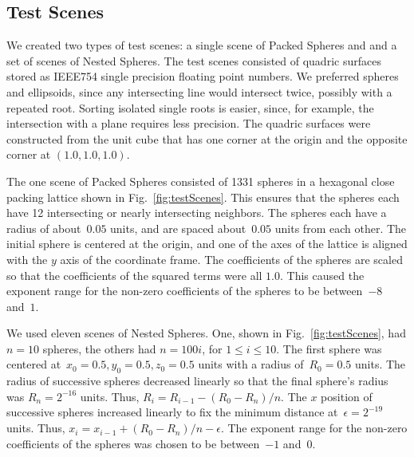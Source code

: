 \documentclass{cccg16}
\begin{document}
\subsection{Test Scenes}
We created two types of test scenes: a single scene of Packed Spheres
and and a set of scenes of Nested Spheres.  The test scenes consisted
of quadric surfaces stored as IEEE754 single precision floating point
numbers.  We preferred spheres and ellipsoids, since any intersecting
line would intersect twice, possibly with a repeated root.  Sorting
isolated single roots is easier, since, for example, the intersection
with a plane requires less precision. The quadric surfaces were
constructed from the unit cube that has one corner at the origin and
the opposite corner at $(1.0, 1.0, 1.0)$.

The one scene of Packed Spheres consisted of 1331 spheres in a
hexagonal close packing lattice shown in Fig.~\ref{fig:testScenes}.
This ensures that the spheres each have 12 intersecting or nearly
intersecting neighbors.  The spheres each have a radius of
about~$0.05$ units, and are spaced about~$0.05$ units from each other.
The initial sphere is centered at the origin, and one of the axes of
the lattice is aligned with the $y$ axis of the coordinate frame.  The
coefficients of the spheres are scaled so that the coefficients of the
squared terms were all $1.0$. This caused the exponent range for the
non-zero coefficients of the spheres to be between~$-8$ and~$1$.

We used eleven scenes of Nested Spheres. One, shown in
Fig.~\ref{fig:testScenes}, had $n=10$ spheres, the others had
$n=100i$, for $1\leq i \leq 10$.  The first sphere was centered
at~$x_0=0.5, y_0=0.5, z_0=0.5$ units with a radius of~$R_0=0.5$ units.
The radius of successive spheres decreased linearly so that the final
sphere's radius was $R_n=2^{-16}$ units.  Thus,
$R_i=R_{i-1}-(R_0-R_n)/n$.  The $x$ position of successive spheres
increased linearly to fix the minimum distance at~$\epsilon=2^{-19}$
units. Thus, $x_i=x_{i-1}+(R_0-R_n)/n-\epsilon$.  The exponent range
for the non-zero coefficients of the spheres was chosen to be
between~$-1$ and~$0$.
\end{document}
